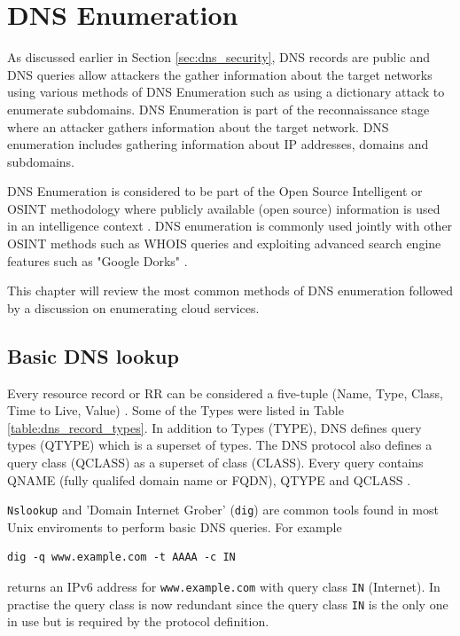 \section{DNS Enumeration}

As discussed earlier in Section \ref{sec:dns_security}, DNS records are public and DNS queries allow attackers the gather information about the target networks using various methods of DNS Enumeration such as using a dictionary attack to enumerate subdomains. DNS Enumeration is part of the reconnaissance stage where an attacker gathers information about the target network. DNS enumeration includes gathering information about IP addresses, domains and subdomains.

DNS Enumeration is considered to be part of the Open Source Intelligent or OSINT methodology where publicly available (open source) information is used in an intelligence context \cite{network_sec_assessment}. DNS enumeration is commonly used jointly with other OSINT methods such as WHOIS queries and exploiting advanced search engine features such as "Google Dorks" \cite{network_sec_assessment}.

This chapter will review the most common methods of DNS enumeration followed by a discussion on enumerating cloud services.

\subsection{Basic DNS lookup}

Every resource record or RR can be considered a five-tuple (Name, Type, Class, Time to Live, Value) \cite{RFC1035}. Some of the Types were listed in Table \ref{table:dns_record_types}. In addition to Types (TYPE), DNS defines query types (\textsf{QTYPE}) which is a superset of types. The DNS protocol also defines a query class (\textsf{QCLASS}) as a superset of class (\textsf{CLASS}). Every query contains \textsf{QNAME} (fully qualifed domain name or \textsf{FQDN}), QTYPE and QCLASS \cite{RFC1035}.

\texttt{Nslookup} and 'Domain Internet Grober' (\texttt{dig}) are common tools found in most Unix enviroments to perform basic DNS queries. For example
\begin{verbatim}
dig -q www.example.com -t AAAA -c IN
\end{verbatim}
returns an IPv6 address for \texttt{www.example.com} with query class \texttt{IN} (Internet). In practise the query class is now redundant since the query class \texttt{IN} is the only one in use but is required by the protocol definition.

